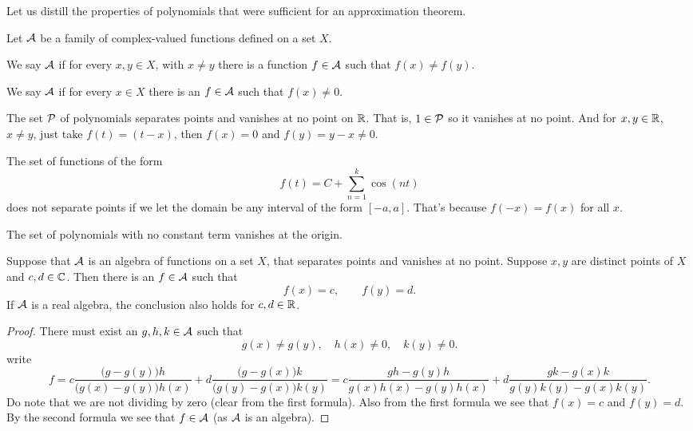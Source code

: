 Let us distill the properties of polynomials that were sufficient
for an approximation theorem.

\begin{defn}
Let ${\mathcal{A}}$ be a family of complex-valued functions defined on a set $X$.

We say ${\mathcal{A}}$ \emph{}
if for every $x,y \in X$, with $x \not= y$ there is a function $f \in {\mathcal{A}}$ such that
$f(x) \not= f(y)$.

We say ${\mathcal{A}}$ \emph{} if for every $x \in X$
there is an $f \in {\mathcal{A}}$ such that $f(x) \not= 0$.
\end{defn}

\begin{example}
The set ${\mathcal{P}}$ of polynomials separates points and vanishes at no point
on ${\mathbb{R}}$.  That is, $1 \in {\mathcal{P}}$ so it vanishes at no point.  And for $x,y \in
{\mathbb{R}}$, $x\not= y$, just take $f(t) = (t-x)$, then $f(x) = 0$ and $f(y) = y-x
\not= 0$.
\end{example}

\begin{example}
The set of functions of the form
\begin{equation*}
f(t) = C + \sum_{n=1}^k \cos(nt)
\end{equation*}
does not separate points if we let the domain be any interval of the form
$[-a,a]$.  That's because $f(-x) = f(x)$ for all $x$.
\end{example}

\begin{example}
The set of polynomials with no constant term vanishes at the origin.
\end{example}

\begin{prop} \label{prop:SWinterpolate}
Suppose that ${\mathcal{A}}$ is an algebra of functions on a set $X$, that separates points
and vanishes at no point.  Suppose $x,y$ are distinct points of $X$ and
$c,d \in {\mathbb{C}}$.  Then there is an $f \in {\mathcal{A}}$ such that
\begin{equation*}
f(x) = c, \qquad f(y) = d .
\end{equation*}
If ${\mathcal{A}}$ is a real algebra, the conclusion also holds for $c,d \in {\mathbb{R}}$.
\end{prop}

\begin{proof}
There must exist an $g,h,k \in {\mathcal{A}}$
such that 
\begin{equation*}
g(x) \not= g(y), \quad h(x) \not= 0, \quad k(y) \not= 0 .
\end{equation*}
write
\begin{equation*}
f = 
c
\frac{\bigl(g - g(y)\bigr)h}{\bigl(g(x)-g(y)\bigr)h(x) } + 
d
\frac{\bigl(g - g(x)\bigr)k}{\bigl(g(y)-g(x)\bigr)k(y)}
=
c
\frac{gh - g(y)h}{g(x)h(x)-g(y)h(x) } + 
d
\frac{gk - g(x)k}{g(y)k(y)-g(x)k(y)} .
\end{equation*}
Do note that we are not dividing by zero (clear from the first formula).
Also from the first formula we see that $f(x) = c$ and $f(y) = d$.
By the second formula we see that $f \in {\mathcal{A}}$ (as ${\mathcal{A}}$ is an algebra).
\end{proof}

